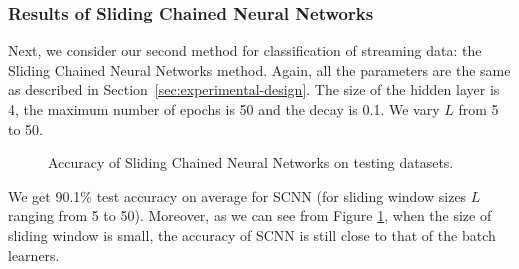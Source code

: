 \documentclass[conference]{IEEEtran}
\begin{document}
		
		\subsubsection{Results of Sliding Chained Neural Networks}
		\label{sec:scnn-results}
		
		Next, we consider our second method for classification of streaming data: the Sliding Chained Neural Networks method.
		Again, all the parameters are the same as described in Section~\ref{sec:experimental-design}. The size of the hidden layer is 4, the maximum number of epochs is 50 and the decay is 0.1. We vary $L$ from 5 to 50.
	
		\begin{figure}[H]
			\centering
			\caption{Accuracy of Sliding Chained Neural Networks on  testing datasets.}
			\label{fig:results-nnet-ensemble-AAA}
		\end{figure}
		
		
		We get 90.1\% test accuracy on average for SCNN (for sliding window sizes $L$ ranging from 5 to 50). Moreover, as we can see from Figure \ref{fig:results-nnet-ensemble-AAA}, when the size of sliding window is small, the accuracy of SCNN is still close to that of the batch learners.
		
			
			
			
\end{document}
